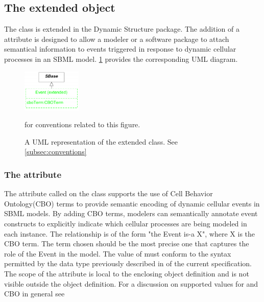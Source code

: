 \subsection{The extended  object}
\label{subsec:extEvent}

The \Event class is extended in the Dynamic Structure package. The addition of a  attribute is designed to allow a modeler or a software package to attach semantical information to events triggered in response to dynamic cellular processes in an SBML model. \ref{fig:UMLExtendedEvent} provides the corresponding UML diagram. 

\begin{figure}[tbhp]
  \centering
  \includegraphics[width=0.25\textwidth]{images/UMLExtendedEvent.pdf}\\
  \caption{A UML representation of the extended \Event class. See \ref{subsec:conventions}} for conventions related to this figure. \label{fig:UMLExtendedEvent}
\end{figure}

\subsubsection{The  attribute}
\label{attr:cboTerm}

The attribute called  on the \Event class supports the use of Cell Behavior Ontology(CBO) terms to provide semantic encoding of dynamic cellular events in SBML models. By adding CBO terms, modelers can semantically annotate event constructs to explicitly indicate which cellular processes are being modeled in each \Event instance. The relationship is of the form "the Event is-a X", where X is the CBO term. The term chosen should be the most precise one that captures the role of the Event in the model. The value of  must conform to the syntax permitted by the  data type previously described in  of the current specification. The scope of the  attribute is local to the enclosing object definition and is not visible outside the object definition. For a discussion on supported values for  and CBO in general see 

